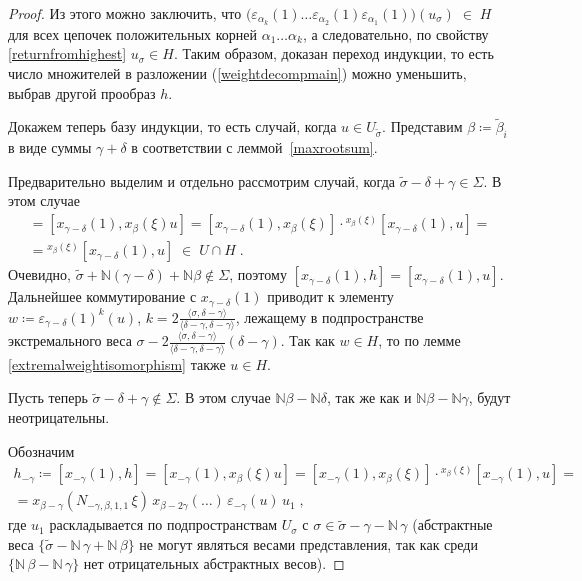 \documentclass[12pt]{matmex-diploma}
\theoremstyle{mystyleni}
\theoremstyle{mystyle}
\newcommand\refb[1]{\ref{#1}}
\newcommand{\N}{\mathbb{N}}
\begin{document}
\begin{proof}
Из этого можно заключить, что $\big(\varepsilon_{\alpha_k}(1)\ldots\varepsilon_{\alpha_2}(1)\varepsilon_{\alpha_1}(1)\big)(u_\sigma) \; \in \; H$ для всех цепочек положительных корней $\alpha_1\ldots\alpha_k$, а следовательно, по свойству \refb{returnfromhighest} $u_\sigma \in H$. Таким образом, доказан переход индукции, то есть число множителей в разложении (\ref{weightdecompmain}) можно уменьшить, выбрав другой прообраз $h$.

Докажем теперь базу индукции, то есть случай, когда $u \in  U_{\widetilde\sigma}$.
Представим $\beta\coloneqq\widetilde\beta_i$ в виде суммы $\gamma+\delta$ в соответствии с леммой~\refb{maxrootsum}.



Предварительно выделим и отдельно рассмотрим случай, когда $\widetilde\sigma-\delta+\gamma \in \Sigma$. В этом случае
\begin{multline*}
[x_{\gamma-\delta}(1),h] = [x_{\gamma-\delta}(1),x_\beta(\xi)u] = [x_{\gamma-\delta}(1),x_\beta(\xi)] \cdot {}^{x_\beta(\xi)}[x_{\gamma-\delta}(1),u] =\\=
{}^{x_\beta(\xi)}[x_{\gamma-\delta}(1),u] \;\in\; U\cap H \;.
\end{multline*}
Очевидно, $\widetilde\sigma + \N(\gamma-\delta)+\N\beta \notin \Sigma$, поэтому
$[x_{\gamma-\delta}(1),h] = [x_{\gamma-\delta}(1),u]$. Дальнейшее коммутирование с $x_{\gamma-\delta}(1)$ приводит к элементу $w\coloneqq\varepsilon_{\gamma-\delta}(1)^k(u)$, $k=2\frac{\langle\sigma,\delta-\gamma\rangle}{\langle\delta-\gamma,\delta-\gamma\rangle}$, лежащему в подпространстве экстремального веса $\sigma-2\frac{\langle\sigma,\delta-\gamma\rangle}{\langle\delta-\gamma,\delta-\gamma\rangle}(\delta-\gamma)$. Так как $w\in H$, то по лемме \refb{extremalweightisomorphism} также $u \in H$.

Пусть теперь $\widetilde\sigma-\delta+\gamma \notin \Sigma$. В этом случае $\N\beta-\N\delta$, так же как и $\N\beta-\N\gamma$, будут неотрицательны.

Обозначим
\begin{multline*}
h_{-\gamma} \coloneqq [x_{-\gamma}(1),h] = [x_{-\gamma}(1),x_\beta(\xi) u] = [x_{-\gamma}(1),x_\beta(\xi)] \cdot {}^{x_\beta(\xi)}[x_{-\gamma}(1),u] = \\ =
x_{\beta-\gamma}(N_{-\gamma,\beta,1,1} \,\xi) \, x_{\beta-2\gamma}(\ldots) \, \varepsilon_{-\gamma}(u) \, u_1 \; ,
\end{multline*}
где $u_1$ раскладывается по подпространствам $U_\sigma$ с $\sigma \in \widetilde\sigma-\gamma - \N \, \gamma$ (абстрактные веса $\{\widetilde\sigma-\N\,\gamma+\N\,\beta\}$ не могут являться весами представления, так как среди $\{\N\,\beta-\N\,\gamma\}$ нет отрицательных абстрактных весов).


\end{proof}
\end{document}
